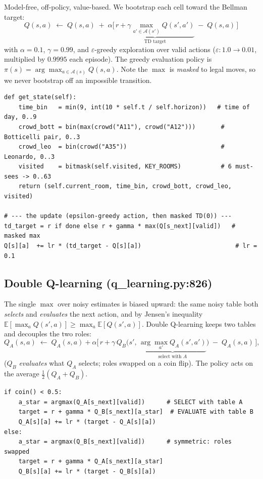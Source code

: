 \documentclass[11pt]{article}
\newcommand{\E}{\mathbb{E}}
\newcommand{\Acal}{\mathcal{A}}
\begin{document}
Model-free, off-policy, value-based. We bootstrap each cell toward the Bellman target:
\[
\boxed{\;Q(s,a)\;\leftarrow\;Q(s,a)\;+\;\alpha\Big[\,\underbrace{r+\gamma\!\!\max_{a'\in\Acal(s')}\!Q(s',a')}_{\text{TD target}}\;-\;Q(s,a)\,\Big]\;}
\]
with $\alpha=0.1$, $\gamma=0.99$, and $\varepsilon$-greedy exploration over valid actions
($\varepsilon:1.0\!\to\!0.01$, multiplied by $0.9995$ each episode). The greedy
evaluation policy is $\pi(s)=\arg\max_{a\in\Acal(s)} Q(s,a)$. Note the $\max$ is
\emph{masked} to legal moves, so we never bootstrap off an impossible transition.

\begin{lstlisting}
def get_state(self):
    time_bin   = min(9, int(10 * self.t / self.horizon))   # time of day, 0..9
    crowd_bott = bin(max(crowd("A11"), crowd("A12")))       # Botticelli pair, 0..3
    crowd_leo  = bin(crowd("A35"))                          # Leonardo, 0..3
    visited    = bitmask(self.visited, KEY_ROOMS)           # 6 must-sees -> 0..63
    return (self.current_room, time_bin, crowd_bott, crowd_leo, visited)

# --- the update (epsilon-greedy action, then masked TD(0)) ---
td_target = r if done else r + gamma * max(Q[s_next][valid])   # masked max
Q[s][a]  += lr * (td_target - Q[s][a])                          # lr = 0.1
\end{lstlisting}

\subsection{Double Q-learning (q\_learning.py:826)}

The single $\max$ over noisy estimates is biased upward: the same noisy table both
\emph{selects} and \emph{evaluates} the next action, and by Jensen's inequality
$\E[\max_a Q(s',a)]\ge \max_a \E[Q(s',a)]$. Double Q-learning keeps two tables and
decouples the two roles:
\[
Q_A(s,a)\;\leftarrow\;Q_A(s,a)+\alpha\Big[\,r+\gamma\,Q_B\big(s',\,\underbrace{\arg\max_{a'} Q_A(s',a')}_{\text{select with }A}\big)\;-\;Q_A(s,a)\,\Big],
\]
($Q_B$ \emph{evaluates} what $Q_A$ selects; roles swapped on a coin flip). The policy
acts on the average $\tfrac12(Q_A+Q_B)$.

\begin{lstlisting}
if coin() < 0.5:
    a_star = argmax(Q_A[s_next][valid])      # SELECT with table A
    target = r + gamma * Q_B[s_next][a_star]  # EVALUATE with table B
    Q_A[s][a] += lr * (target - Q_A[s][a])
else:
    a_star = argmax(Q_B[s_next][valid])      # symmetric: roles swapped
    target = r + gamma * Q_A[s_next][a_star]
    Q_B[s][a] += lr * (target - Q_B[s][a])
\end{lstlisting}
\end{document}
